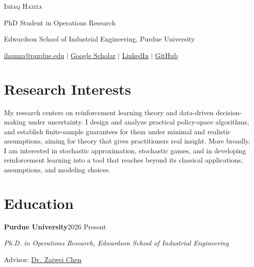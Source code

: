 \documentclass[11pt,letterpaper]{article}
\newcommand{\entry}[2]{\needspace{6\baselineskip}\textbf{#1}\hfill #2\par}
\newcommand{\sub}[2]{{\itshape #1}\hfill{#2}\par}
\begin{document}
\begin{center}
  {\fontsize{25}{30}\selectfont\scshape Ishaq Hamza}\par\vspace{5pt}
  PhD Student in Operations Research\par
  Edwardson School of Industrial Engineering, Purdue University\par\vspace{4pt}
  \href{mailto:ihamza@purdue.edu}{ihamza@purdue.edu}
  \enspace$\vert$\enspace
  \href{https://scholar.google.com/citations?user=RCmlLGgAAAAJ&hl=en}{Google Scholar}
  \enspace$\vert$\enspace
  \href{https://www.linkedin.com/in/ishaqhamza}{LinkedIn}
  \enspace$\vert$\enspace
  \href{https://github.com/IshaqHamza}{GitHub}
\end{center}

\section*{Research Interests}
My research centers on reinforcement learning theory and data-driven decision-making under uncertainty.
I design and analyze practical policy-space algorithms, and establish
finite-sample guarantees for them under minimal and realistic assumptions, aiming for theory that gives
practitioners real insight. More broadly, I am interested in stochastic
approximation, stochastic games, and in developing reinforcement learning into
a tool that reaches beyond its classical applications, assumptions, and modeling choices.

\section*{Education}
\entry{Purdue University}{2026 \textendash{} Present}
\sub{Ph.D. in Operations Research, Edwardson School of Industrial Engineering}{}
Advisor: \href{https://sites.google.com/view/zaiweichen/home}{Dr.~Zaiwei Chen}\par
\end{document}
